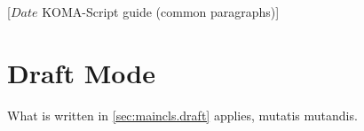 %
%
%
%
%
%
%
%
% 
%
%
%
%

                 [$Date$
                  KOMA-Script guide (common paragraphs)]


\makeatletter
{}%
%
%
%
\makeatother


\section{Draft Mode}
\label{sec:\csname label@base\endcsname.draft}%
\ifshortversion\IgnoreThisfalse{}\fi%
\ifIgnoreThis %
What is written in 
\autoref{sec:maincls.draft} applies, mutatis mutandis.
\else %
%

